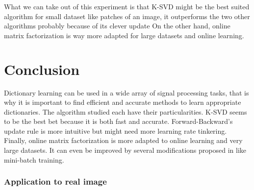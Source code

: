 \documentclass[a4paper,11pt]{article}
\begin{document}
What we can take out of this experiment is that K-SVD might be the best suited algorithm for small dataset like patches of an image, it outperforms the two other algorithms probably because of its clever update
On the other hand, online matrix factorization is way more adapted for large datasets and online learning.

\section{Conclusion}
Dictionary learning can be used in a wide array of signal processing tasks, that is why it is important to find efficient and accurate methods to learn appropriate dictionaries.
The algorithm studied each have their particularities. K-SVD seems to be the best bet because it is both fast and accurate. Forward-Backward's update rule is more intuitive but might need more learning rate tinkering. Finally, online matrix factorization is more adapted to online learning and very large datasets. It can even be improved by several modifications proposed in \cite{mairal10} like mini-batch training.

\subsubsection*{Application to real image}
\end{document}
